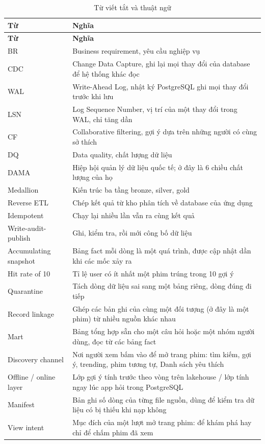 \documentclass[a4paper,11pt]{article}
\newlength{\reporttablewidth}
\begin{document}
\begingroup
\small
{}
\setlength{\tabcolsep}{4pt}
\renewcommand{\arraystretch}{1.18}
\setlength{\reporttablewidth}{\dimexpr\linewidth-2\tabcolsep\relax}
\begin{longtable}{@{}L{0.29\reporttablewidth} L{0.71\reporttablewidth}@{}}
\caption[Từ viết tắt và thuật ngữ (Phụ lục C)]{Từ viết tắt và thuật ngữ}\label{tab:25} \\
\toprule
\textbf{Từ} & \textbf{Nghĩa} \\
\midrule
\endfirsthead
\toprule
\textbf{Từ} & \textbf{Nghĩa} \\
\midrule
\endhead
\midrule
\endfoot
\bottomrule
\endlastfoot
BR & Business requirement, yêu cầu nghiệp vụ \\
CDC & Change Data Capture, ghi lại mọi thay đổi của database để hệ thống khác đọc \\
WAL & Write-Ahead Log, nhật ký PostgreSQL ghi mọi thay đổi trước khi lưu \\
LSN & Log Sequence Number, vị trí của một thay đổi trong WAL, chỉ tăng dần \\
CF & Collaborative filtering, gợi ý dựa trên những người có cùng sở thích \\
DQ & Data quality, chất lượng dữ liệu \\
DAMA & Hiệp hội quản lý dữ liệu quốc tế; ở đây là 6 chiều chất lượng của họ \\
Medallion & Kiến trúc ba tầng bronze, silver, gold \\
Reverse ETL & Chép kết quả từ kho phân tích về database của ứng dụng \\
Idempotent & Chạy lại nhiều lần vẫn ra cùng kết quả \\
Write-audit-publish & Ghi, kiểm tra, rồi mới công bố dữ liệu \\
Accumulating snapshot & Bảng fact mỗi dòng là một quá trình, được cập nhật dần khi các mốc xảy ra \\
Hit rate of 10 & Tỉ lệ user có ít nhất một phim trúng trong 10 gợi ý \\
Quarantine & Tách dòng dữ liệu sai sang một bảng riêng, dòng đúng đi tiếp \\
Record linkage & Ghép các bản ghi của cùng một đối tượng (ở đây là một phim) từ nhiều nguồn khác nhau \\
Mart & Bảng tổng hợp sẵn cho một câu hỏi hoặc một nhóm người dùng, đọc từ các bảng fact \\
Discovery channel & Nơi người xem bấm vào để mở trang phim: tìm kiếm, gợi ý, trending, phim tương tự, Danh sách yêu thích \\
Offline / online layer & Lớp gợi ý tính trước theo vòng trên lakehouse / lớp tính ngay lúc app hỏi trong PostgreSQL \\
Manifest & Bản ghi số dòng của từng file nguồn, dùng để kiểm tra dữ liệu có bị thiếu khi nạp không \\
View intent & Mục đích của một lượt mở trang phim: để khám phá hay chỉ để chấm phim đã xem \\
\end{longtable}
\endgroup
\end{document}
